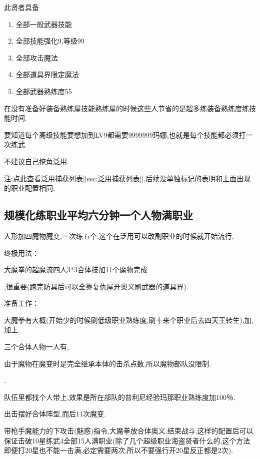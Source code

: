 		此贤者具备
		\begin{enumerate}
			\item 全部一般武器技能
			\item 全部技能强化9,等级99
			\item 全部攻击魔法
			\item 全部道具界限定魔法
			\item 全部武器熟练度55
		\end{enumerate}
		
		在没有准备好装备熟练屋技能熟练屋的时候这些人节省的是超多练装备熟练度练技能时间.

		要知道每个高级技能要想加到LV9都需要9999999玛娜,也就是每个技能都必须打一次练武.

		不建议自己挖角泛用.

		注:点此查看泛用捕获列表[\ref{sec:泛用捕获列表}],后续没单独标记的表明和上面出现的职业配置相同.


		\subsection{规模化练职业平均六分钟一个人物满职业}


		人形加四魔物魔变,一次练五个.这个在泛用可以改副职业的时候就开始流行.

		终极用法：

		大魔拳的超魔流四人3*3合体技加11个魔物完成

		{\color{red}{修罗巴尔必备杰洛肯,有男主最好,需要大量千万级能力角色,所以这步可视为本修罗巴尔攻略法的必经之路}}

		{\color{red}{记得练上魔女和兔兔莉亚,同步探索魔界收集41武器}},很重要(跑完防具后可以全靠复仇屋开奥义刷武器的道具界).

		准备工作：

		大魔拳有大概{\color{red}{200万能力}}(开始少的时候刷低级职业熟练度,刷十来个职业后去四天王转生),加{\color{red}{主角的魔能力[合体技增加100％攻击力]}},加上{\color{red}{女主的魔能力[被魅惑的目标会被即死]}}.

		三个合体人物一人有{\color{red}{枪手的能力+魅惑术}},{\color{red}{都带上飞蛾魔能力}}.

		由于魔物在魔变时是完全继承本体的击杀点数,所以魔物部队没限制.

		{\color{red}{四人放到普利尼部队}}.

		队伍里都找个人带上{\color{red}{暴君的普利尼训练能力}},效果是所在部队的普利尼经验玛那职业熟练度加100％.

		出击摆好合体阵型,而后11次魔变.

		带枪手魔能力的下攻击(魅惑)指令,大魔拳放合体奥义.结束战斗.这样的配置后可以保证击破10星练武4全部15人满职业(除了几个超级职业海盗贤者什么的,这个方法即便打20星也不能一击满,必定需要两次,所以不要强行开20星反正都是2次).

